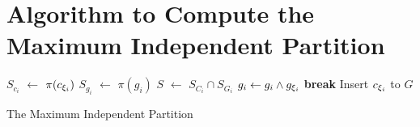 
\section{Algorithm to Compute the Maximum Independent Partition}
\label{appendix:partition}


\IncMargin{1em}
\begin{algorithm}[h]
      \DontPrintSemicolon
      {
            $S_{c_i}$ $\leftarrow$ $\pi(c_{{\xi}_{i}})$ \;
            {
                  $S_{g_i}$ $\leftarrow$ $\pi(g_{i})$ \;
                  $S$ $\leftarrow$ $S_{C_i} \cap S_{G_i}$  \;
                  {
                        $g_{i} \leftarrow g_{i} \land g_{{\xi}_{i}}$ \;
                        \textbf{break} \;
                  }
                  Insert $c_{{\xi}_{i}}$ to $G$
            }
      }
      \caption{The Maximum Independent Partition}
      \label{algo:max-inde}
\end{algorithm}
\DecMargin{1em}





